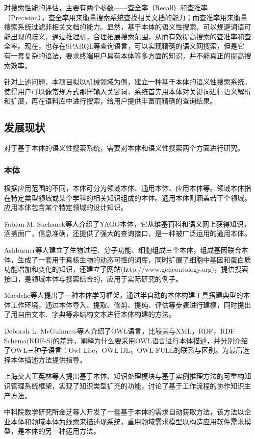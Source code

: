 \documentclass[12pt,a4paper]{article}
\begin{document}
	对搜索性能的评估，主要有两个参数——查全率（Recall）和查准率（Precision），查全率用来衡量搜索系统查找相关文档的能力；而查准率用来衡量搜索系统过滤非相关文档的能力。\cite{4}显然，基于本体的语义性搜索，可以规避词语可能出现的歧义，通过推理机，合理拓展搜索范围，从而有效提高搜索的查准率和查全率。现在，也存在SPARQL等查询语言，可以实现精确的语义网搜索，但是它有一套复杂的语法，要求终端用户具有本体等多方面的知识，并不能真正的提高搜索效率。

	针对上述问题，本项目拟以机械领域为例，建立一种基于本体的语义性搜索系统。使得用户可以像常规方式那样输入关键词，系统首先用本体对关键词进行语义解析和扩展，再在语料库中进行搜索，给用户提供丰富而精确的查询结果。
	\subsection{发展现状}
	对于基于本体的语义性搜索系统，需要对本体和语义性搜索两个方面进行研究。
		\subsubsection{本体}
	根据应用范围的不同，本体可分为领域本体、通用本体、应用本体等。领域本体指在特定类型领域或某个学科的相关知识组成的本体。通用本体则涵盖若干个领域。应用本体包含某个特定领域的设计知识。
	
	Fabian M. Suchanek\cite{5}等人介绍了YAGO本体，它从维基百科和语义网上获得知识，涵盖面广，信息准确，还提供了强大的查询接口，是一种被广泛运用的通用本体。
	
	Ashburner\cite{6}等人建立了生物过程、分子功能、细胞组成三个本体，组成基因联合本体，生成了一套用于真核生物的动态可控的词库，同时扩展了细胞中基因和蛋白质功能增加和变化的知识，还建立了网站(http://www.geneontology.org)，提供搜索接口，是领域本体与搜索结合的，应用于实际研究的例子。
	
	Maedche\cite{7}等人提出了一种本体学习框架，通过半自动的本体构建工具搭建典型的本体工作环境，通过本体导入、提取、修剪、提纯、评估等步骤进行建模，同时提出了用自由文本、字典等非结构文本进行本体构建的方法。
	
	Deborah L. McGuinness\cite{8}等人介绍了OWL语言，比较其与XML，RDF，RDF Schema(RDF-S)的差异，阐释为什么要采用OWL语言进行本体描述，并分别介绍了OWL三种子语言：Owl Lite，OWL DL，OWL FULL的联系与区别。为最后选择本体描述方法提供指导。
	
	上海交大王英林\cite{9}等人提出基于本体、知识处理模块与基于实例推理方法的可重构知识管理系统框架，实现了知识类型扩充的功能，讨论了基于工作流程的协作知识生产方法。
	
	中科院数学研究所金芝\cite{10}等人开发了一套基于本体的需求自动获取方法，该方法以企业本体和领域本体为线索来描述现系统，重用领域需求模型以构造应用软件需求模型，是本体的另一种运用方法。
	
\end{document}
